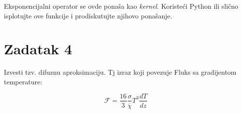 \documentclass[12pt]{article}
\begin{document}
Eksponencijalni operator se ovde pona\v{s}a kao \emph{kernel}. Koriste\'{c}i Python ili sli\v{c}no isplotujte ove funkcije i prodiskutujte njihovo pona\v{s}anje. 

\section{Zadatak 4}

Izvesti tzv. difuznu aproksimaciju. Tj izraz koji povezuje Fluks sa gradijentom temperature: 

\begin{equation}
\mathcal{F} = \frac{16}{3} \frac{\sigma}{\overline{\chi}} T^3 \frac{dT}{dz}
\end{equation}
\end{document}
